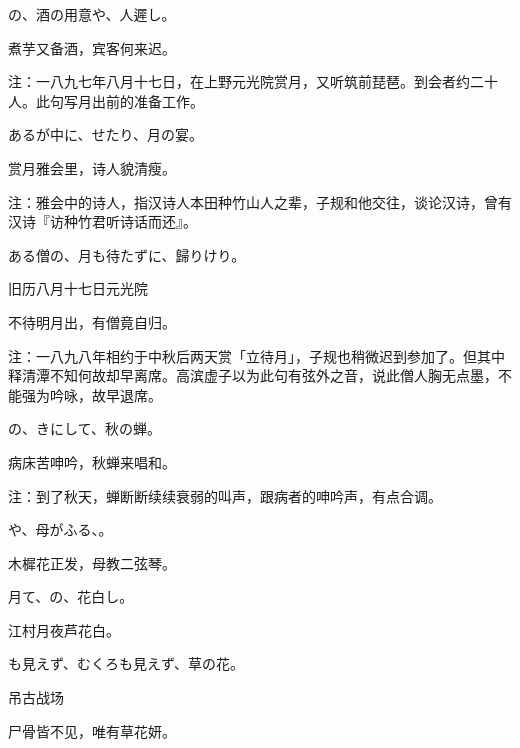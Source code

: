 \begin{haiku}
    {\FH {}の、酒の用意や、人遲し。}

    {\FK 煮芋又备酒，宾客何来迟。}

    {\FT 注：一八九七年八月十七日，在上野元光院赏月，又听筑前琵琶。到会者约二十人。此句写月出前的准备工作。}
\end{haiku}

\begin{haiku}
    {\FH あるが中に、せたり、月の宴。}

    {\FK 赏月雅会里，诗人貌清瘦。}

    {\FT 注：雅会中的诗人，指汉诗人本田种竹山人之辈，子规和他交往，谈论汉诗，曾有汉诗『访种竹君听诗话而还』。}
\end{haiku}

\begin{haiku}
    {\FH ある僧の、月も待たずに、歸りけり。}

    {\FK 旧历八月十七日元光院}

    {\FK 不待明月出，有僧竟自归。}

    {\FT 注：一八九八年相约于中秋后两天赏「立待月」，子规也稍微迟到参加了。但其中释清潭不知何故却早离席。高滨虚子以为此句有弦外之音，说此僧人胸无点墨，不能强为吟咏，故早退席。}
\end{haiku}

\begin{haiku}
    {\FH {}の、きにして、秋の蝉。}

    {\FK 病床苦呻吟，秋蝉来唱和。}

    {\FT 注：到了秋天，蝉断断续续衰弱的叫声，跟病者的呻吟声，有点合调。}
\end{haiku}

\begin{haiku}
    {\FH {}や、母がふる、。}

    {\FK 木樨花正发，母教二弦琴。}
\end{haiku}

\begin{haiku}
    {\FH 月て、の、花白し。}

    {\FK 江村月夜芦花白。}
\end{haiku}

\begin{haiku}
    {\FH {}も見えず、むくろも見えず、草の花。}

    {\FK 吊古战场}

    {\FK 尸骨皆不见，唯有草花妍。}
\end{haiku}


